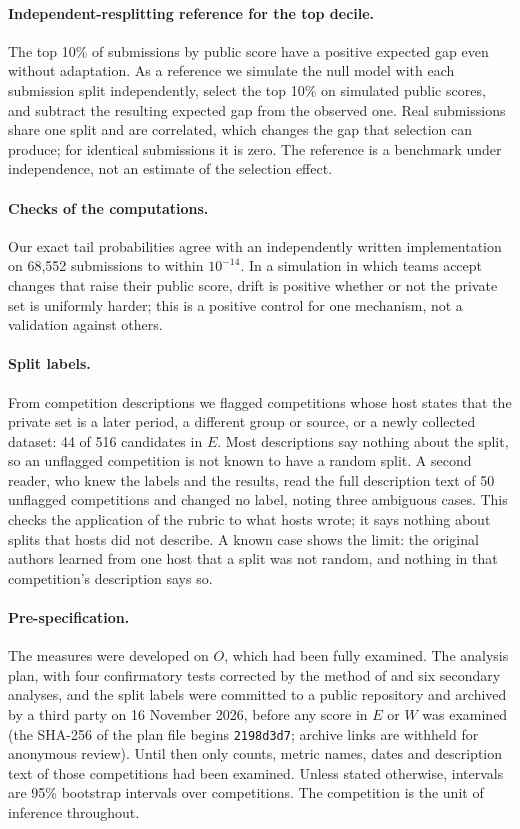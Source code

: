 \documentclass[10pt]{article}
\begin{document}
\paragraph{Independent-resplitting reference for the top decile.} The top 10\% of submissions by public score have a positive expected gap even without adaptation. As a reference we simulate the null model with each submission split independently, select the top 10\% on simulated public scores, and subtract the resulting expected gap from the observed one. Real submissions share one split and are correlated, which changes the gap that selection can produce; for identical submissions it is zero. The reference is a benchmark under independence, not an estimate of the selection effect.

\paragraph{Checks of the computations.} Our exact tail probabilities agree with an independently written implementation on 68,552 submissions to within $10^{-14}$. In a simulation in which teams accept changes that raise their public score, drift is positive whether or not the private set is uniformly harder; this is a positive control for one mechanism, not a validation against others.

\paragraph{Split labels.} From competition descriptions we flagged competitions whose host states that the private set is a later period, a different group or source, or a newly collected dataset: 44 of 516 candidates in $E$. Most descriptions say nothing about the split, so an unflagged competition is not known to have a random split. A second reader, who knew the labels and the results, read the full description text of 50 unflagged competitions and changed no label, noting three ambiguous cases. This checks the application of the rubric to what hosts wrote; it says nothing about splits that hosts did not describe. A known case shows the limit: the original authors learned from one host that a split was not random, and nothing in that competition's description says so.

\paragraph{Pre-specification.} The measures were developed on $O$, which had been fully examined. The analysis plan, with four confirmatory tests corrected by the method of \citet{holm1979} and six secondary analyses, and the split labels were committed to a public repository and archived by a third party on 16 November 2026, before any score in $E$ or $W$ was examined (the SHA-256 of the plan file begins \texttt{2198d3d7}; archive links are withheld for anonymous review). Until then only counts, metric names, dates and description text of those competitions had been examined. Unless stated otherwise, intervals are 95\% bootstrap intervals over competitions. The competition is the unit of inference throughout.
\end{document}
